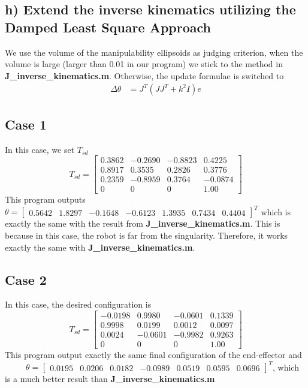 \documentclass[english,10pt,a4paper]{book}
\begin{document}
    \subsection*{h) Extend the inverse kinematics utilizing the Damped Least Square Approach}
    We use the volume of the manipulability ellipsoids as judging criterion, when the volume is large (larger than 0.01 in our program) we stick to the method in \textbf{J\_inverse\_kinematics.m}. Otherwise, the update formulae is switched to
    \begin{align}
        \Delta\theta &= J ^T ( J J^T + k^2 I) e 
    \end{align}
    
    \subsection*{Case 1}
    In this case, we set $T_{sd}$
    \begin{equation}
        T_{sd} = \begin{bmatrix}
            0.3862 & -0.2690 & -0.8823 & 0.4225\\
            0.8917 & 0.3535 & 0.2826 & 0.3776\\
            0.2359 & -0.8959 & 0.3764 &  -0.0874\\
            0 & 0 & 0 & 1.00
        \end{bmatrix}
    \end{equation}
    This program outputs \(\theta = \begin{bmatrix} 0.5642 & 1.8297 & -0.1648 & -0.6123 & 1.3935 & 0.7434 & 0.4404 \end{bmatrix}^T\) which is exactly the same with the result from \textbf{J\_inverse\_kinematics.m}. This is because in this case, the robot is far from the singularity. Therefore, it works exactly the same with \textbf{J\_inverse\_kinematics.m}.

    \subsection*{Case 2}
    In this case, the desired configuration is
    \begin{equation}
        T_{sd} = \begin{bmatrix}
            -0.0198 & 0.9980 & -0.0601 & 0.1339\\
            0.9998 & 0.0199 & 0.0012 & 0.0097\\
            0.0024 & -0.0601 & -0.9982 & 0.9263\\
            0 & 0 & 0 & 1.00
        \end{bmatrix}
    \end{equation}
    This program output exactly the same final configuration of the end-effector and \ \ \ \ \ \(\theta = \begin{bmatrix} 0.0195 & 0.0206 & 0.0182 & -0.0989 & 0.0519 & 0.0595 & 0.0696 \end{bmatrix}^T\), which is a much better result than \textbf{J\_inverse\_kinematics.m}
    
\end{document}
